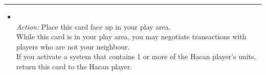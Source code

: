 \begin{multicols}{2}
\vspace{-10pt}\rule{\hsize}{0.4pt}\vspace{5pt}


\begin{itemize}
\item {}\\
\emph{Action:} Place this card face up in your play area.\\
While this card is in your play area, you may negotiate transactions with players who are not your neighbour.\\
If you activate a system that contains 1 or more of the Hacan player's units, return this card to the Hacan player.
\end{itemize}

\end{multicols}



